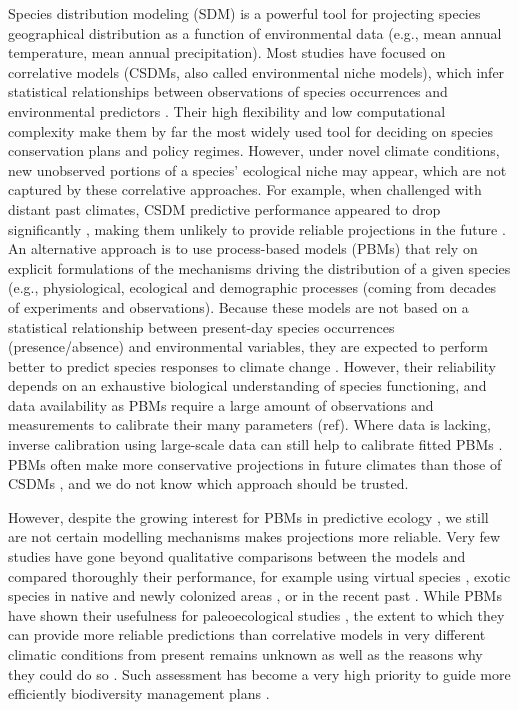 \documentclass[pdflatex, sn-nature]{sn-jnl}%
\begin{document}
Species distribution modeling (SDM) is a powerful tool for projecting species geographical distribution as a function of environmental data (e.g., mean annual temperature, mean annual precipitation). Most studies have focused on correlative models (CSDMs, also called environmental niche models), which infer statistical relationships between observations of species occurrences and environmental predictors \cite{Dormann2012}. Their high flexibility and low computational complexity make them by far the most widely used tool for deciding on species conservation plans and policy regimes. However, under novel climate conditions, new unobserved portions of a species’ ecological niche may appear, which are not captured by these correlative approaches. For example, when challenged with distant past climates, CSDM predictive performance appeared to drop significantly \cite{Maguire2016}, making them unlikely to provide reliable projections in the future \cite{Fitzpatrick2018}. An alternative approach is to use process-based models (PBMs) that rely on explicit formulations of the mechanisms driving the distribution of a given species (e.g., physiological, ecological and demographic processes (coming from decades of experiments and observations). Because these models are not based on a statistical relationship between present-day species occurrences (presence/absence) and environmental variables, they are expected to perform better to predict species responses to climate change  \cite{Evans2012, Singer2016}. However, their reliability depends on an exhaustive biological understanding of species functioning, and data availability as PBMs require a large amount of observations and measurements to calibrate their many parameters  (ref). Where data is lacking, inverse calibration using large-scale data can still help to calibrate fitted PBMs \cite{Dormann2012, VanderMeersch2023}. PBMs often make more conservative projections in future climates than those of CSDMs \cite{Morin2009, Cheaib2012, Gritti2013}, and we do not know which approach should be trusted. 

However, despite the growing interest for PBMs in predictive ecology \cite{Connolly2017, Urban2016, Pilowsky2022}, we still are not certain modelling mechanisms makes projections more reliable. Very few studies have gone beyond qualitative comparisons between the models and compared thoroughly their performance, for example using virtual species \cite{Zurell2016}, exotic species in native and newly colonized areas \cite{Higgins2020}, or in the recent past \cite{Fordham2018}. While PBMs have shown their usefulness for paleoecological studies \cite{Saltre2013, Ruosch2016, Schwoerer2014}, the extent to which they can provide more reliable predictions than correlative models in very different climatic conditions from present remains unknown as well as the reasons why they could do so \cite{UribeRivera2022, Briscoe2019}. Such assessment has become a very high priority to guide more efficiently biodiversity management plans \cite{Pacifici2015}.
\end{document}
